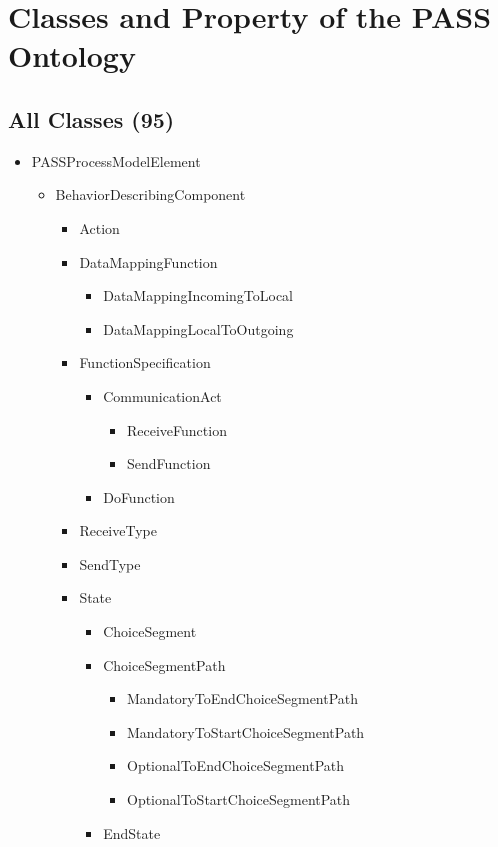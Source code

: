 \chapter{Classes and Property of the PASS Ontology}


\section{All Classes (95)}

\begin{itemize}
\item PASSProcessModelElement
\begin{itemize}
	\item BehaviorDescribingComponent
	\begin{itemize}
		\item Action
		\item DataMappingFunction
		\begin{itemize}
			\item DataMappingIncomingToLocal
			\item DataMappingLocalToOutgoing
		\end{itemize}
		\item FunctionSpecification
		\begin{itemize}
			\item CommunicationAct
			\begin{itemize}
				\item ReceiveFunction
				\item SendFunction
			\end{itemize}
			\item DoFunction
		\end{itemize}
		\item ReceiveType
		\item SendType
		\item State
		\begin{itemize}
			\item ChoiceSegment
			\item ChoiceSegmentPath
			\begin{itemize}
				\item MandatoryToEndChoiceSegmentPath
				\item MandatoryToStartChoiceSegmentPath
				\item OptionalToEndChoiceSegmentPath
				\item OptionalToStartChoiceSegmentPath
			\end{itemize}
			\item EndState

\end{itemize}
\end{itemize}
\end{itemize}
\end{itemize}
